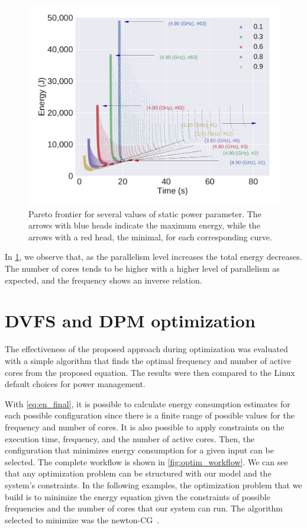 \begin{figure}[H]
	\includegraphics[width=\columnwidth]{models/figures/analisys/pareto_w_high.pdf}
	\caption{Pareto frontier for several values of static power parameter. The arrows with blue heads indicate the maximum energy, while the arrows with a red head, the minimal, for each corresponding curve.}%
	\label{fig:pareto_w}
\end{figure}

In  \cref{fig:pareto_w}, we observe that, as the parallelism level increases the total energy decreases. The number of cores tends to be higher with a higher level of parallelism as expected, and the frequency shows an inverse relation.


\section{DVFS and DPM optimization} \label{sec:dvfs_dpm_optminzation}
The effectiveness of the proposed approach during optimization was evaluated with a simple algorithm that finds the optimal frequency and number of active cores from the proposed equation. The results were then compared to the Linux default choices for power management.

With \cref{eq:en_final}, it is possible to calculate energy consumption estimates for each possible configuration since there is a finite range of possible values for the frequency and number of cores. It is also possible to apply constraints on the execution time, frequency, and the number of active cores. Then, the configuration that minimizes energy consumption for a given input can be selected. The complete workflow is shown in \cref{fig:optim_workflow}. We can see that any optimization problem can be structured with our model and the system's constraints. In the following examples, the optimization problem that we build is to minimize the energy equation given the constraints of possible frequencies and the number of cores that our system can run. The algorithm selected to minimize was the newton-CG~\cite{Royer2020AOptimization}.

